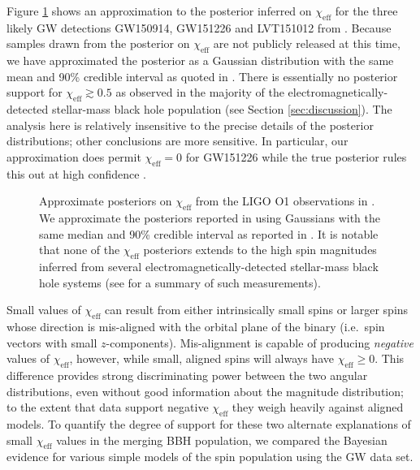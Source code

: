 \documentclass[modern,linenumbers]{aastex61}
\newcommand{\chieff}{\chi_\mathrm{eff}}
\begin{document}
Figure \ref{fig:O1-posteriors} shows an approximation to the posterior
inferred on $\chieff$ for the three likely \ac{GW} detections
GW150914, GW151226 and LVT151012 from \citet{O1-BBH}.  Because samples
drawn from the posterior on $\chieff$ are not publicly released at
this time, we have approximated the posterior as a Gaussian
distribution with the same mean and 90\% credible interval as quoted
in \citet{O1-BBH}.  There is essentially no posterior support for
$\chieff \gtrsim 0.5$ as observed in the majority of the
electromagnetically-detected stellar-mass black hole population (see
Section \ref{sec:discussion}).  The analysis here is relatively
insensitive to the precise details of the posterior distributions;
other conclusions are more sensitive.  In particular, our
approximation does permit $\chieff = 0$ for GW151226 while the true
posterior rules this out at high confidence
\citep{2016PhRvL.116x1103A,O1-BBH}.

\begin{figure}
  \caption{\label{fig:O1-posteriors} Approximate posteriors on
    $\chieff$ from the LIGO O1 observations in \citet{O1-BBH}.  We
    approximate the posteriors reported in \citet{O1-BBH} using
    Gaussians with the same median and 90\% credible interval as
    reported in \citet{O1-BBH}.  It is notable that none of the
    $\chieff$ posteriors extends to the high spin magnitudes inferred
    from several electromagnetically-detected stellar-mass black hole
    systems (see \citet{2015PhR...548....1M} for a summary of such
    measurements).}
\end{figure}

Small values of $\chieff$ can result from either intrinsically small
spins or larger spins whose direction is mis-aligned with the orbital
plane of the binary (i.e.\ spin vectors with small $z$-components).
Mis-alignment is capable of producing \emph{negative} values of
$\chieff$, however, while small, aligned spins will always have
$\chieff \geq 0$.  This difference provides strong discriminating
power between the two angular distributions, even without good
information about the magnitude distribution; to the extent that data
support negative $\chieff$ they weigh heavily against aligned models.
To quantify the degree of support for these two alternate explanations
of small $\chieff$ values in the merging \ac{BBH} population, we
compared the Bayesian evidence for various simple models of the spin
population using the \ac{GW} data set.
\end{document}
